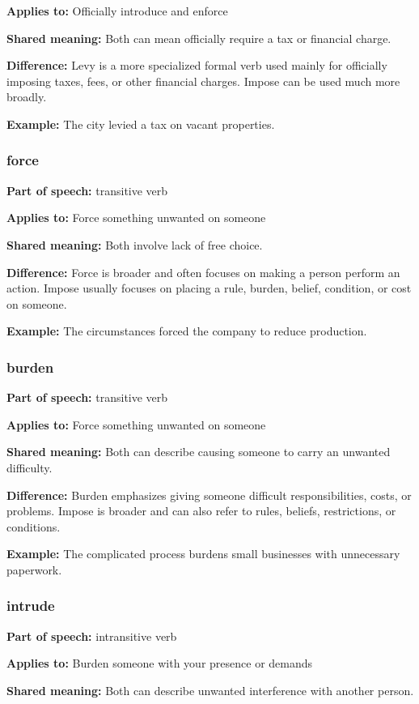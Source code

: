 \documentclass[11pt]{article}
\begin{document}
\textbf{Applies to:} Officially introduce and enforce

\textbf{Shared meaning:} Both can mean officially require a tax or financial charge.

\textbf{Difference:} Levy is a more specialized formal verb used mainly for officially imposing taxes, fees, or other financial charges. Impose can be used much more broadly.

\textbf{Example:} The city levied a tax on vacant properties.

\subsubsection{force}
\textbf{Part of speech:} transitive verb

\textbf{Applies to:} Force something unwanted on someone

\textbf{Shared meaning:} Both involve lack of free choice.

\textbf{Difference:} Force is broader and often focuses on making a person perform an action. Impose usually focuses on placing a rule, burden, belief, condition, or cost on someone.

\textbf{Example:} The circumstances forced the company to reduce production.

\subsubsection{burden}
\textbf{Part of speech:} transitive verb

\textbf{Applies to:} Force something unwanted on someone

\textbf{Shared meaning:} Both can describe causing someone to carry an unwanted difficulty.

\textbf{Difference:} Burden emphasizes giving someone difficult responsibilities, costs, or problems. Impose is broader and can also refer to rules, beliefs, restrictions, or conditions.

\textbf{Example:} The complicated process burdens small businesses with unnecessary paperwork.

\subsubsection{intrude}
\textbf{Part of speech:} intransitive verb

\textbf{Applies to:} Burden someone with your presence or demands

\textbf{Shared meaning:} Both can describe unwanted interference with another person.
\end{document}
